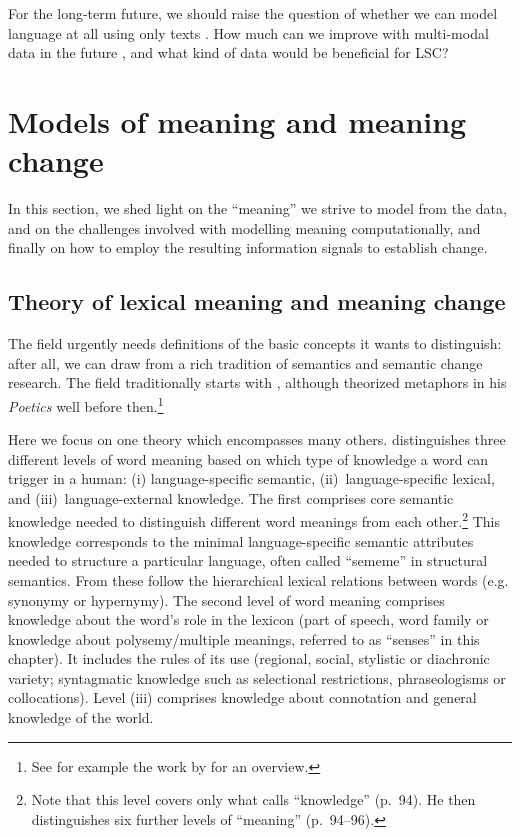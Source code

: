\documentclass[output=paper]{langscibook}
\begin{document}
For the long-term future, we should raise the question of whether we  can model language at all using only texts \citep{bender2020climbing}. How much can we improve with multi-modal data in the future \citep{bruni2012distributional}, and what kind of data would be beneficial for LSC?

\section{Models of meaning and meaning change}
\label{s:theory}


In this section, we shed light on the ``meaning'' we strive to model from the data, and on the challenges involved with modelling meaning computationally, and finally on how to employ the resulting information signals to establish change.

\subsection{Theory of lexical meaning and meaning change}
\label{sec:theorylex}
The field urgently needs definitions of the basic concepts it wants to distinguish: after all, we can draw from a rich tradition of semantics and semantic change research. The field traditionally starts with \citet{reisig1839vorlesungen}, although \citet{aristotle335bc} theorized metaphors in his \emph{Poetics} well before then.\footnote{See for example the work by \citet{mague2005changements} for an overview.}

\begin{sloppypar}
Here we focus on one theory which encompasses many others. \citet[54]{blank97xvi} distinguishes three different levels of word meaning based on which type of knowledge a word can trigger in a human: (i) language-specific semantic, (ii)~language-specific lexical, and (iii)~language-external knowledge. The first comprises core semantic knowledge needed to distinguish different word meanings from each other.\footnote{Note that this level  covers only what \citet{blank97xvi} calls ``knowledge'' (p.~94). He then distinguishes six further levels of ``meaning'' (p.~94--96).} This knowledge corresponds to the minimal language-specific semantic attributes needed to structure a particular language, often called ``sememe'' in structural semantics. From these follow the hierarchical lexical relations between words (e.g. synonymy or hypernymy). The second level of word meaning comprises knowledge about the word's role in the lexicon (part of speech, word family or knowledge about polysemy\slash multiple meanings, referred to as ``senses'' in this chapter). It includes the rules of its use (regional, social, stylistic or diachronic variety; syntagmatic knowledge such as selectional restrictions, phraseologisms or collocations). Level (iii) comprises knowledge about connotation and general knowledge of the world. 
\end{sloppypar}
\end{document}
